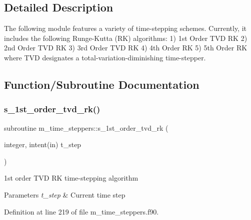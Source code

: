 \subsection{Detailed Description}
The following module features a variety of time-\/stepping schemes. Currently, it includes the following Runge-\/\+Kutta (RK) algorithms\+: 1) 1st Order T\+VD RK 2) 2nd Order T\+VD RK 3) 3rd Order T\+VD RK 4) 4th Order RK 5) 5th Order RK where T\+VD designates a total-\/variation-\/diminishing time-\/stepper. 

\subsection{Function/\+Subroutine Documentation}
\mbox{\label{namespacem__time__steppers_a1057850f94e9e749da9687baa7478246}} 
\subsubsection{\texorpdfstring{s\+\_\+1st\+\_\+order\+\_\+tvd\+\_\+rk()}{s\_1st\_order\_tvd\_rk()}}
{\footnotesize\ttfamily subroutine m\+\_\+time\+\_\+steppers\+::s\+\_\+1st\+\_\+order\+\_\+tvd\+\_\+rk (\begin{DoxyParamCaption}\item[{integer, intent(in)}]{t\+\_\+step }\end{DoxyParamCaption})}



1st order T\+VD RK time-\/stepping algorithm 


\begin{DoxyParams}{Parameters}
{\em t\+\_\+step} & Current time step \\
\hline
\end{DoxyParams}


Definition at line 219 of file m\+\_\+time\+\_\+steppers.\+f90.

\mbox{\label{namespacem__time__steppers_a5b758874c713da801a47aa3d6246b2fd}} 
